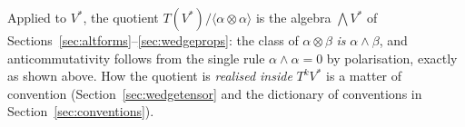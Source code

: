 \begin{remark}\label{rem:normalisation}
Applied to $V^*$, the quotient $T(V^*)/\langle\alpha\otimes\alpha\rangle$ is the algebra $\bigwedge V^*$ of
Sections~\ref{sec:altforms}--\ref{sec:wedgeprops}: the
class of $\alpha\otimes\beta$ \emph{is} $\alpha\wedge\beta$, and anticommutativity follows from the single rule $\alpha\wedge\alpha=0$ by
polarisation, exactly as shown above. How the quotient is \emph{realised inside} $T^kV^*$ is a matter of convention
(Section~\ref{sec:wedgetensor} and the dictionary of conventions in Section~\ref{sec:conventions}).
\end{remark}
